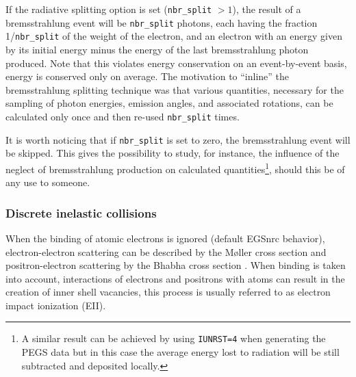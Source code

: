 If the radiative splitting option is set ({\tt nbr\_split} $> 1$),
the result of a bremsstrahlung event will be {\tt nbr\_split}
photons, each having the fraction 1/{\tt nbr\_split} of
the weight of the electron, and an electron with an
energy given by its initial energy minus the energy of
the last bremsstrahlung photon produced. Note that
this violates energy conservation on an event-by-event
basis, energy is conserved only on average. The
motivation to ``inline'' the bremsstrahlung splitting technique
was that various quantities, necessary for the sampling
of photon energies, emission angles, and associated
rotations, can be calculated only once and then re-used
{\tt  nbr\_split} times.

It is worth noticing that if {\tt nbr\_split} is set
to zero, the bremsstrahlung event will be skipped. 
This gives the possibility to study, for instance, the
influence of the neglect of bremsstrahlung production
on calculated quantities\footnote{A similar result
can be achieved by using {\tt IUNRST=4} when generating
the PEGS data but in this case the average energy lost to radiation
will be still subtracted and deposited locally.}, should
this be of any use to someone.

\subsubsection{Discrete inelastic collisions}
\label{discrete_inel}
\setcounter{equation}{0}


When the binding of atomic electrons is ignored (default EGSnrc behavior), 
electron-electron scattering can be described by the 
M{\o}ller cross section \cite{Mo32a} and 
positron-electron scattering by the Bhabha cross section 
\cite{Bh35}. When binding is taken into account, interactions of 
electrons and positrons with atoms can result in the creation of inner 
shell vacancies, this process is usually referred to as electron impact 
ionization (EII). 

